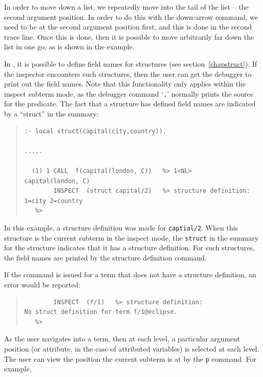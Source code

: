 \begin{descr}{1cm}
In order to move down a list, we repeatedly move into the tail of the list
-- the second argument position. In order to do this with the down-arrow
command, we need to be at the second argument position first, and this is
done in the second trace line. Once this is done, then it is possible to
move arbitrarily far down the list in one go, as is shown in the example.


In \eclipse, it is possible to define field names for structures (see
section~\ref{chapstruct}). If the inspector encounters such structures,
then the user can get the debugger to print out the field names. Note that
this functionality only applies within the inspect subterm mode, as the
debugger command `\verb'.'' normally prints the source for the predicate. 
The fact that a structure has defined field names are indicated by a
``struct'' in the summary: 

\begin{quote}\begin{verbatim}
:- local struct(capital(city,country)).

.....

  (1) 1 CALL  f(capital(london, C))   %> 1<NL>
capital(london, C)
        INSPECT  (struct capital/2)   %> structure definition:
1=city 2=country
   %> 
\end{verbatim}\end{quote}

In this example, a structure definition was made for \verb'captial/2'. When
this structure is the current subterm in the inspect mode, the
\verb'struct' in the summary for the structure indicates that it has
a structure definition. For such structures, the field names are printed by
the structure definition command. 

If the command is issued for a term that does not have a structure
definition, an error would be reported:

\begin{quote}\begin{verbatim}
        INSPECT  (f/1)   %> structure definition:
No struct definition for term f/1@eclipse.
   %> 
\end{verbatim}\end{quote}


As the user navigates into a term, then at each level, a particular
argument position (or attribute, in the case of attributed variables) is
selected at each level. The user can view the position the current subterm
is at by the \verb'p' command. For example,


\end{descr}
